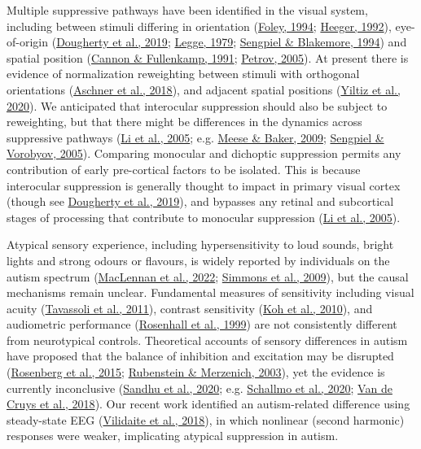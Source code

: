 \documentclass[
]{article}
\begin{document}
Multiple suppressive pathways have been identified in the visual system, including between stimuli differing in orientation (\protect\hyperlink{ref-Foley1994}{Foley, 1994}; \protect\hyperlink{ref-Heeger1992}{Heeger, 1992}), eye-of-origin (\protect\hyperlink{ref-Dougherty2019}{Dougherty et al., 2019}; \protect\hyperlink{ref-Legge1979}{Legge, 1979}; \protect\hyperlink{ref-Sengpiel1994}{Sengpiel \& Blakemore, 1994}) and spatial position (\protect\hyperlink{ref-Cannon1991}{Cannon \& Fullenkamp, 1991}; \protect\hyperlink{ref-Petrov2005}{Petrov, 2005}). At present there is evidence of normalization reweighting between stimuli with orthogonal orientations (\protect\hyperlink{ref-Aschner2018}{Aschner et al., 2018}), and adjacent spatial positions (\protect\hyperlink{ref-Yiltiz2020}{Yiltiz et al., 2020}). We anticipated that interocular suppression should also be subject to reweighting, but that there might be differences in the dynamics across suppressive pathways (\protect\hyperlink{ref-Li2005}{Li et al., 2005}; e.g. \protect\hyperlink{ref-Meese2009}{Meese \& Baker, 2009}; \protect\hyperlink{ref-Sengpiel2005}{Sengpiel \& Vorobyov, 2005}). Comparing monocular and dichoptic suppression permits any contribution of early pre-cortical factors to be isolated. This is because interocular suppression is generally thought to impact in primary visual cortex (though see \protect\hyperlink{ref-Dougherty2019}{Dougherty et al., 2019}), and bypasses any retinal and subcortical stages of processing that contribute to monocular suppression (\protect\hyperlink{ref-Li2005}{Li et al., 2005}).

Atypical sensory experience, including hypersensitivity to loud sounds, bright lights and strong odours or flavours, is widely reported by individuals on the autism spectrum (\protect\hyperlink{ref-MacLennan2022}{MacLennan et al., 2022}; \protect\hyperlink{ref-Simmons2009}{Simmons et al., 2009}), but the causal mechanisms remain unclear. Fundamental measures of sensitivity including visual acuity (\protect\hyperlink{ref-Tavassoli2011}{Tavassoli et al., 2011}), contrast sensitivity (\protect\hyperlink{ref-Koh2010}{Koh et al., 2010}), and audiometric performance (\protect\hyperlink{ref-Rosenhall1999}{Rosenhall et al., 1999}) are not consistently different from neurotypical controls. Theoretical accounts of sensory differences in autism have proposed that the balance of inhibition and excitation may be disrupted (\protect\hyperlink{ref-Rosenberg2015}{Rosenberg et al., 2015}; \protect\hyperlink{ref-Rubenstein2003}{Rubenstein \& Merzenich, 2003}), yet the evidence is currently inconclusive (\protect\hyperlink{ref-Sandhu2020}{Sandhu et al., 2020}; e.g. \protect\hyperlink{ref-Schallmo2020}{Schallmo et al., 2020}; \protect\hyperlink{ref-VandeCruys2018}{Van de Cruys et al., 2018}). Our recent work identified an autism-related difference using steady-state EEG (\protect\hyperlink{ref-Vilidaite2018}{Vilidaite et al., 2018}), in which nonlinear (second harmonic) responses were weaker, implicating atypical suppression in autism.
\end{document}
